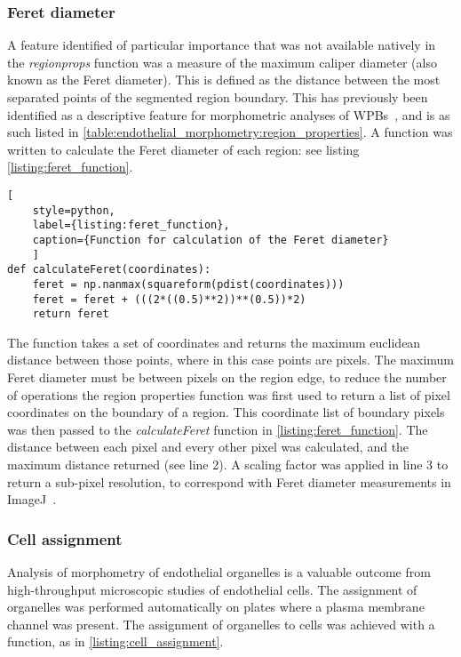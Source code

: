 \subsubsection{Feret diameter}
A feature identified of particular importance that was not available natively in the \emph{regionprops} function was a measure of the maximum caliper diameter (also known as the Feret diameter). This is defined as the distance between the most separated points of the segmented region boundary. This has previously been identified as a descriptive feature for morphometric analyses of WPBs~\cite{Ferraro2014}, and is as such listed in \autoref{table:endothelial_morphometry:region_properties}. A function was written to calculate the Feret diameter of each region: see listing \autoref{listing:feret_function}.

\begin{lstlisting}[
	style=python,
	label={listing:feret_function},
	caption={Function for calculation of the Feret diameter}
	]
def calculateFeret(coordinates):
    feret = np.nanmax(squareform(pdist(coordinates)))
    feret = feret + (((2*((0.5)**2))**(0.5))*2)
    return feret
\end{lstlisting}

The function takes a set of coordinates and returns the maximum euclidean distance between those points, where in this case points are pixels. The maximum Feret diameter must be between pixels on the region edge, to reduce the number of operations the region properties function was first used to return a list of pixel coordinates on the boundary of a region. This coordinate list of boundary pixels was then passed to the \emph{calculateFeret} function in \autoref{listing:feret_function}. The distance between each pixel and every other pixel was calculated, and the maximum distance returned (see line 2). A scaling factor was applied in line 3 to return a sub-pixel resolution, to correspond with Feret diameter measurements in ImageJ~\cite{ImageJ2003}.

\subsubsection{Cell assignment}
\label{endothelial_morphometry:image_processing:cell_assignment}
Analysis of morphometry of endothelial organelles is a valuable outcome from high-throughput microscopic studies of endothelial cells. The assignment of organelles was performed automatically on plates where a plasma membrane channel was present. The assignment of organelles to cells was achieved with a function, as in \autoref{listing:cell_assignment}.

